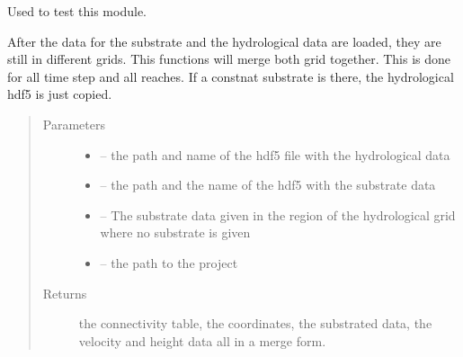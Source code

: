 \documentclass[letterpaper,10pt,english]{sphinxmanual}
\begin{document}

\begin{fulllineitems}
\label{\detokenize{index:src.substrate.main}}
Used to test this module.

\end{fulllineitems}


\begin{fulllineitems}
\label{\detokenize{index:src.substrate.merge_grid_hydro_sub}}
After the data for the substrate and the hydrological data are loaded, they are still in different grids.
This functions will merge both grid together. This is done for all time step and all reaches. If a
constnat substrate is there, the hydrological hdf5 is just copied.
\begin{quote}\begin{description}
\item[{Parameters}] \leavevmode\begin{itemize}
\item {} 
 -- the path and name of the hdf5 file with the hydrological data

\item {} 
 -- the path and the name of the hdf5 with the substrate data

\item {} 
 -- The substrate data given in the region of the hydrological grid where no substrate is given

\item {} 
 -- the path to the project

\end{itemize}

\item[{Returns}] \leavevmode
the connectivity table, the coordinates, the substrated data, the velocity and height data all in a merge form.

\end{description}\end{quote}

\end{fulllineitems}
\end{document}

